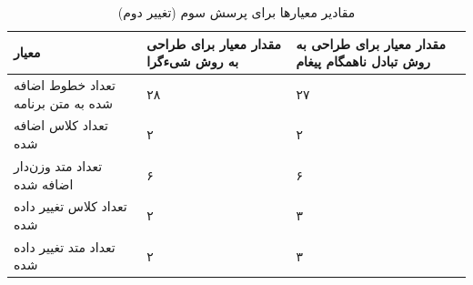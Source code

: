 \begin{enumerate}

\begin{table}
\begin{center}
\begin{tabular}{|p{7cm}|p{4cm}|p{4cm}|}
	\hline
\textbf{معیار} & \textbf{مقدار معیار برای طراحی به روش شیءگرا} & \textbf{مقدار معیار برای طراحی به روش تبادل ناهمگام پیغام} 
\\ 
	\hline
	تعداد خطوط اضافه شده به متن برنامه
	 &
	 ۲۸
	 &
	 ۲۷
\\
	\hline
	تعداد کلاس اضافه شده
	 &
	 ۲
	 &
	 ۲
\\
	\hline
	تعداد متد وزن‌دار اضافه شده
	 &
	 ۶
	 &
	 ۶
\\
	\hline

	تعداد کلاس تغییر داده شده
	 &
	۲
	 &
	 ۳
\\
	\hline

	تعداد متد تغییر داده شده
	 &
	۲
	 &
	 ۳
\\
	\hline

\end{tabular}
\caption{\label{table:mod_result_3_2} مقادیر معیارها برای پرسش سوم (تغییر دوم)}
\end{center}
\end{table}

\end{enumerate}


\FloatBarrier
